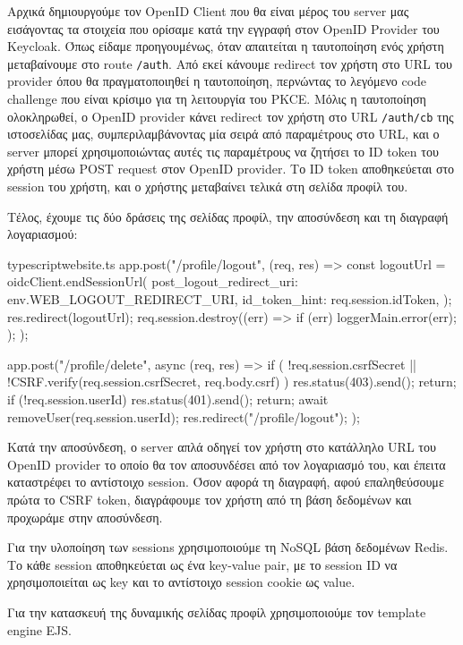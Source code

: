 \documentclass[../thesis.tex]{subfiles}
\begin{document}
Αρχικά δημιουργούμε τον OpenID Client που θα είναι μέρος του server μας εισάγοντας τα στοιχεία που ορίσαμε κατά την εγγραφή στον OpenID Provider του Keycloak.
Όπως είδαμε προηγουμένως, όταν απαιτείται η ταυτοποίηση ενός χρήστη μεταβαίνουμε στο route \texttt{/auth}.
Από εκεί κάνουμε redirect τον χρήστη στο URL του provider όπου θα πραγματοποιηθεί η ταυτοποίηση, περνώντας το λεγόμενο code challenge που είναι κρίσιμο για τη λειτουργία του PKCE.
Μόλις η ταυτοποίηση ολοκληρωθεί, ο OpenID provider κάνει redirect τον χρήστη στο URL \texttt{/auth/cb} της ιστοσελίδας μας, συμπεριλαμβάνοντας μία σειρά από παραμέτρους στο URL, και ο server μπορεί χρησιμοποιώντας αυτές τις παραμέτρους να ζητήσει το ID token του χρήστη μέσω POST request στον OpenID provider.
Το ID token αποθηκεύεται στο session του χρήστη, και ο χρήστης μεταβαίνει τελικά στη σελίδα προφίλ του.

Τέλος, έχουμε τις δύο δράσεις της σελίδας προφίλ, την αποσύνδεση και τη διαγραφή λογαριασμού:

\begin{codeblock}{typescript}{website.ts}
  app.post("/profile/logout", (req, res) => {
    const logoutUrl = oidcClient.endSessionUrl({
      post_logout_redirect_uri: env.WEB_LOGOUT_REDIRECT_URI,
      id_token_hint: req.session.idToken,
    });
    res.redirect(logoutUrl);
    req.session.destroy((err) => {
      if (err) loggerMain.error(err);
    });
  });

  app.post("/profile/delete", async (req, res) => {
    if (
      !req.session.csrfSecret ||
      !CSRF.verify(req.session.csrfSecret, req.body.csrf)
    ) {
      res.status(403).send();
      return;
    }
    if (!req.session.userId) {
      res.status(401).send();
      return;
    }
    await removeUser(req.session.userId);
    res.redirect("/profile/logout");
  });
\end{codeblock}

Κατά την αποσύνδεση, ο server απλά οδηγεί τον χρήστη στο κατάλληλο URL του OpenID provider το οποίο θα τον αποσυνδέσει από τον λογαριασμό του, και έπειτα καταστρέφει το αντίστοιχο session.
Όσον αφορά τη διαγραφή, αφού επαληθεύσουμε πρώτα το CSRF token, διαγράφουμε τον χρήστη από τη βάση δεδομένων και προχωράμε στην αποσύνδεση.


Για την υλοποίηση των sessions χρησιμοποιούμε τη NoSQL βάση δεδομένων Redis.
Το κάθε session αποθηκεύεται ως ένα key-value pair, με το session ID να χρησιμοποιείται ως key και το αντίστοιχο session cookie ως value.

Για την κατασκευή της δυναμικής σελίδας προφίλ χρησιμοποιούμε τον template engine EJS.
\end{document}
